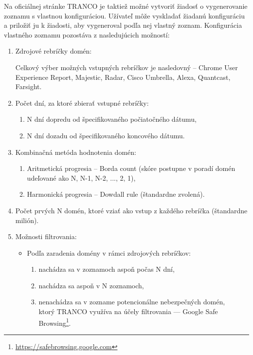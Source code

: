 Na oficiálnej stránke TRANCO je taktiež možné vytvoriť žiadosť o vygenerovanie zoznamu s vlastnou konfiguráciou.
Užívateľ môže vyskladať žiadanú konfiguráciu a priložiť ju k žiadosti, aby vygeneroval podľa nej vlastný zoznam.
Konfigurácia vlastného zoznamu pozostáva z nasledujúcich možností: \cite{tranco-config}
\begin{enumerate}
    \item Zdrojové rebríčky domén:
    
    Celkový výber možných vstupných rebríčkov je nasledovný -- Chrome User Experience Report, Majestic, Radar, Cisco Umbrella, Alexa, Quantcast, Farsight.
    
    \item Počet dní, za ktoré zbierať vstupné rebríčky:
    \begin{enumerate}
        \item N dní dopredu od špecifikovaného počiatočného dátumu,
        \item N dní dozadu od špecifikovaného koncového dátumu.
    \end{enumerate}

    \item Kombinačná metóda hodnotenia domén:
    \begin{enumerate}
        \item Aritmetická progresia -- Borda count (skóre postupne v poradí domén udeľované ako N, N-1, N-2, ..., 2, 1),
        \item Harmonická progresia -- Dowdall rule (štandardne zvolená).
    \end{enumerate}

    \item Počet prvých N domén, ktoré vziať ako vstup z každého rebríčka (štandardne milión).

    \pagebreak

    \item Možnosti filtrovania:
    \begin{itemize}
        \item Podľa zaradenia domény v rámci zdrojových rebríčkov:
        \begin{enumerate}
            \item nachádza sa v zoznamoch aspoň počas N dní,
            \item nachádza sa aspoň v N zoznamoch,
            \item nenachádza sa v zozname potencionálne nebezpečných domén, \\ ktorý TRANCO využíva na účely filtrovania --- Google Safe Browsing\footnote{\href{https://safebrowsing.google.com}{https://safebrowsing.google.com}}.
        \end{enumerate}


\end{itemize}
\end{enumerate}
